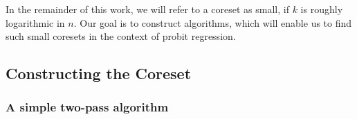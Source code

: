 In the remainder of this work, we will refer to a coreset as
small, if $k$ is roughly logarithmic in $n$.
Our goal is to construct algorithms, which will enable us to
find such small coresets in the context of probit regression.





\subsection{Constructing the Coreset}





\subsubsection{A simple two-pass algorithm}

